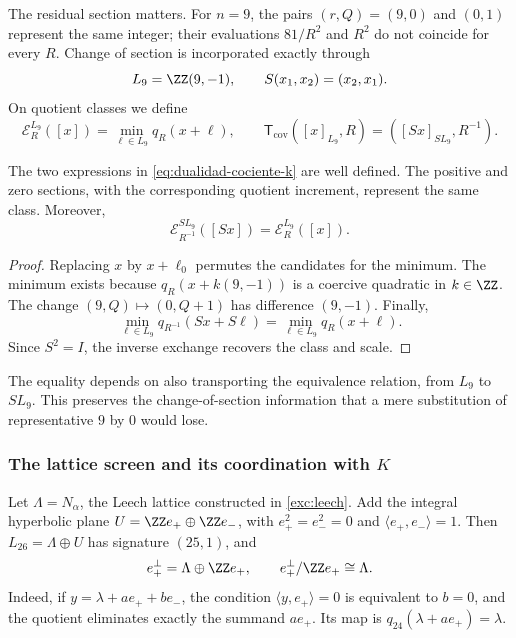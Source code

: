 The residual section matters. For \(n=9\), the pairs
\((r,Q)=(9,0)\) and \((0,1)\) represent the same integer;
their evaluations \(81/R^2\) and \(R^2\) do not coincide for every
\(R\). Change of section is incorporated exactly through
\[
 L_9=\ZZ(9,-1),\qquad S(x_1,x_2)=(x_2,x_1).
\]
On quotient classes we define
\begin{equation}
 \mathcal E_R^{L_9}([x])=\min_{\ell\in L_9}q_R(x+\ell),
 \qquad
 \mathsf T_{\mathrm{cov}}([x]_{L_9},R)
       =([Sx]_{SL_9},R^{-1}).
 \label{eq:dualidad-cociente-k}
\end{equation}

\begin{proposition}
The two expressions in \eqref{eq:dualidad-cociente-k} are well
defined. The positive and zero sections, with the corresponding
quotient increment, represent the same class. Moreover,
\[
 \mathcal E_{R^{-1}}^{SL_9}([Sx])=\mathcal E_R^{L_9}([x]).
\]
\end{proposition}
\begin{proof}
Replacing \(x\) by \(x+\ell_0\) permutes the candidates for the minimum.
The minimum exists because \(q_R(x+k(9,-1))\) is a coercive quadratic
in \(k\in\ZZ\). The change \((9,Q)\mapsto(0,Q+1)\)
has difference \((9,-1)\). Finally,
\[
 \min_{\ell\in L_9}q_{R^{-1}}(Sx+S\ell)
 =\min_{\ell\in L_9}q_R(x+\ell).
\]
Since \(S^2=I\), the inverse exchange recovers the class and scale.
\end{proof}

The equality depends on also transporting the equivalence relation,
from \(L_9\) to \(SL_9\). This preserves the change-of-section
information that a mere substitution of representative \(9\) by
\(0\) would lose.

\subsubsection{The lattice screen and its coordination with \(K\)}

Let \(\Lambda=N_\alpha\), the Leech lattice constructed in
\ref{exc:leech}. Add the integral hyperbolic plane
\(U=\ZZ e_+\oplus\ZZ e_-\), with
\(e_+^2=e_-^2=0\) and \(\langle e_+,e_-\rangle=1\).
Then \(L_{26}=\Lambda\oplus U\) has signature \((25,1)\), and
\[
 e_+^\perp=\Lambda\oplus\ZZ e_+,
 \qquad e_+^\perp/\ZZ e_+\cong\Lambda.
\]
Indeed, if \(y=\lambda+ae_++be_-\), the condition
\(\langle y,e_+\rangle=0\) is equivalent to \(b=0\), and the quotient
eliminates exactly the summand \(ae_+\). Its map is
\(q_{24}(\lambda+ae_+)=\lambda\).

